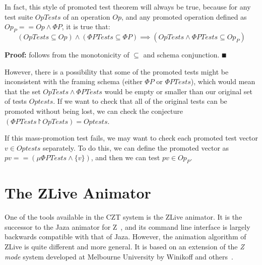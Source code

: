\documentclass{llncs}
\begin{document}
In fact, this style of promoted test theorem will always be true,
because for any test suite $OpTests$ of an operation $Op$,
and any promoted operation defined as $Op_P == Op \land \Phi P$,
it is true that:
\[
   (OpTests \subseteq Op) \land (\Phi PTests \subseteq \Phi P)
   \implies (OpTests \land \Phi PTests \subseteq Op_P)
\]

\textbf{Proof:} follows from the monotonicity of $\subseteq$ and schema
conjunction. $\QED$

However, there is a possibility that some of the promoted tests
might be inconsistent with the framing schema (either $\Phi P$ or $\Phi
PTests$), which would mean that the set $OpTests \land \Phi PTests$
would be empty or smaller than our original set of tests $Optests$.
If we want to check that all of the original tests can be promoted without
being lost, we can check the conjecture
$(\Phi PTests \project OpTests) = Optests$.

If this mass-promotion test fails, we may want to check each promoted test 
vector $v \in Optests$ separately.  To do this, we can define the promoted
vector as $pv == (\mu \Phi PTests \land \{v\})$, and then we can test 
$pv \in Op_P$.


\section{The ZLive Animator}\label{sect:zlive}

One of the tools available in the CZT system is the ZLive animator.
It is the successor to the Jaza animator for Z~\cite{utting:jaza},
and its command line interface is largely backwards compatible with that of
Jaza.  However, the animation algorithm of ZLive is quite different and
more general.  It is based on an extension of the \emph{Z mode} system
developed at Melbourne University by Winikoff and
others~\cite{kazmierczak:animation98,winikoff:modes-subtypes98}.
\end{document}
